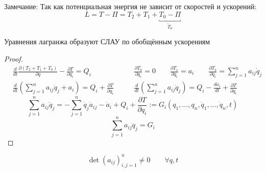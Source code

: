 \documentclass[crop=false]{standalone}
\begin{document}
Замечание: Так как потенциальная энергия не зависит от скоростей и ускорений:
\[L = T - \Pi = T_2 + T_1 + \underbracket{T_0 - \Pi}_{\tilde T_0}\]

\noindent \keypoint 
Уравнения лагранжа образуют СЛАУ по обобщённым ускорениям
\begin{proof}   
    \[
    \begin{aligned}
    &\frac{d}{d t} \frac{\partial (T_2 + T_1 + T_0)}{\partial \dot q} - \frac{\partial T}{\partial q_i} = Q_i \qquad &\frac{\partial T_0}{\partial \dot q_i} = 0 \qquad \frac{\partial T_1}{\partial \dot q_i} = a_i \qquad \frac{\partial T_2}{\partial \dot q_i} = \sum_{j=1}^{n} a_{i j } \dot q_j \\
    &\frac{d}{d t} \left( \sum_{j=1}^{n} a_{i j} \dot q_j+ a_i \right) = Q_i + \frac{\partial T}{\partial q_i} \qquad &\frac{d}{d t} \left( \sum_{j=1}^{n} a_{i j} \dot q_j\right) = Q_i - \frac{d a_i}{d t}+ \frac{\partial T}{\partial q_i}
    \end{aligned}\]
    \[\sum_{j=1}^{n} a_{i j} \ddot q_j = - \sum_{j=1}^{n} \dot q_j \dot a_{i j} - \dot a_i + Q_i + \frac{\partial T}{\partial q_i} := G_i(q_1 , \dots , q_n, \dot q_1, \dots, \dot q_n, t)\]
    \[\sum_{j=1}^{n} a_{i j} \ddot q_j = G_i\]
\end{proof}
    \begin{theorem}
        \[\det (a_{i j})_{i, j = 1}^n \neq 0 \qquad \forall q, t\]
    \end{theorem}
\end{document}
